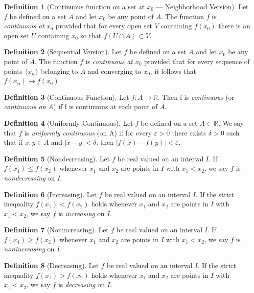 \documentclass[11pt]{article}
\def \R {\mathbb{R}}
\def \epsilon {\varepsilon}
\newcommand{\set}[1]{\{#1\}}
\def \xn {x_n}
\theoremstyle{definition}
\newtheorem{definition}{Definition}[section]
\begin{document}
\begin{definition} [Continuous function on a set at $ x_0 $ --- Neighborhood Version]
	Let $ f $ be defined on a set $ A $ and let $ x_0 $ be any point of $ A $. The function $ f $ is \textit{continuous at $ x_0 $} provided that for every open set $ V $ containing $ f(x_0) $ there is an open set $ U $ containing $ x_0 $ so that $ f(U \cap A) \subset V $.
\end{definition}


\begin{definition} [Sequential Version]
	Let $ f $ be defined on a set $ A $ and let $ x_0 $ be any point of $ A $. The function $ f $ is \textit{continuous at $ x_0 $} provided that for every sequence of points $ \set{\xn} $ belonging to $ A $ and converging to $ x_0 $, it follows that $ f(\xn) \rightarrow f(x_0) $.
\end{definition}


\begin{definition} [Continuous Function]
	Let $ f : A \rightarrow \R $. Then f is \textit{continuous} (or \textit{continuous on $ A $}) if f is continuous at each point of $ A $.
\end{definition}

\setcounter{definition}{45}
\begin{definition} [Uniformly Continuous]
	Let $ f $ be defined on a set $ A \subset \R $. We say that $ f $ is \textit{uniformly
	continuous} (on A) if for every $ \epsilon > 0 $ there exists $ \delta > 0 $ such that if $ x, y \in A $ and $ |x - y| < \delta $, then $ |f(x) - f(y)| < \epsilon $.
\end{definition}

\setcounter{definition}{55}
\begin{definition} [Nondecreasing]
	Let $ f $ be real valued on an interval $ I $. If $ f(x_1) \leq f(x_2) $ whenever $ x_1 $
	and $ x_2 $ are points in $ I $ with $ x_1 < x_2 $, we say $ f $ is \textit{nondecreasing} on $ I $.
\end{definition}


\begin{definition} [Increasing]
	Let $ f $ be real valued on an interval $ I $. If the strict inequality $ f(x_1) < f(x_2) $ holds whenever $ x_1 $ and $ x_2 $ are points in $ I $ with $ x_1 < x_2 $, we say $ f $ is \textit{increasing} on $ I $.
\end{definition}


\begin{definition} [Nonincreasing]
	Let $ f $ be real valued on an interval $ I $. If $ f(x_1) \geq f(x_2) $ whenever $ x_1 $ and $ x_2 $ are points in $ I $ with $ x_1 < x_2 $, we say $ f $ is \textit{nonincreasing} on $ I $.
\end{definition}


\begin{definition} [Decreasing]
	Let $ f $ be real valued on an interval $ I $. If the strict inequality $ f(x_1) > f(x_2) $ holds whenever $ x_1 $ and $ x_2 $ are points in $ I $ with $ x_1 < x_2 $, we say $ f $ is \textit{decreasing} on $ I $.
\end{definition}
\end{document}
